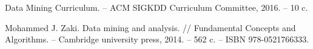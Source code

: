 \begingroup 
\renewcommand{\section}[2]{\anonsection{Список литературы}}
\begin{thebibliography}{00}
    
    Data Mining Curriculum.
    -- ACM SIGKDD Curriculum Committee, 2016. -- 10 c.

    Mohammed J. Zaki.
    Data mining and analysis. //
    Fundamental Concepts and Algorithms.
    -- Cambridge university press, 2014. -- 562 c.
    -- ISBN 978-0521766333.



\end{thebibliography}
\endgroup

\clearpage